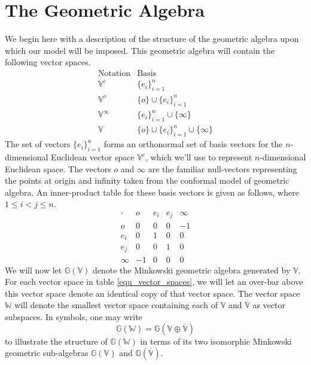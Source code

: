 \documentclass{birkjour}
\theoremstyle{definition}
\theoremstyle{remark}
\numberwithin{equation}{section}
\newcommand{\G}{\mathbb{G}}
\newcommand{\V}{\mathbb{V}}
\newcommand{\Vb}{\mathbb{\overline{V}}}
\newcommand{\W}{\mathbb{W}}
\newcommand{\nvao}{o}
\newcommand{\nvai}{\infty}
\begin{document}
\section{The Geometric Algebra}

We begin here with a description of the structure of the geometric algebra upon
which our model will be imposed.  This
geometric algebra will contain the following vector spaces.
\begin{equation}\label{equ_vector_spaces}
\begin{array}{ll}
\mbox{Notation} & \mbox{Basis} \\
\hline
\V^e & \{e_i\}_{i=1}^n \\
\V^{\nvao} & \{\nvao\}\cup\{e_i\}_{i=1}^n \\
\V^{\nvai} & \{e_i\}_{i=1}^n\cup\{\nvai\} \\
\V & \{\nvao\}\cup\{e_i\}_{i=1}^n\cup\{\nvai\}
\end{array}
\end{equation}
The set of vectors $\{e_i\}_{i=1}^n$ forms an orthonormal set of basis
vectors for the $n$-dimensional Euclidean vector space $\V^e$, which we'll
use to represent $n$-dimensional Euclidean space.
The vectors $\nvao$ and $\nvai$ are the familiar null-vectors representing the
points at origin and infinity taken from the conformal model of geometric algebra.
An inner-product table for these basis vectors is given as follows, where
$1\leq i<j\leq n$.
\begin{equation}
\begin{array}{c|cccc}
\cdot & \nvao & e_i & e_j & \nvai \\
\hline
\nvao & 0 & 0 & 0 & -1 \\
e_i & 0 & 1 & 0 & 0 \\
e_j & 0 & 0 & 1 & 0 \\
\nvai & -1 & 0 & 0 & 0
\end{array}
\end{equation}
We will now let $\G(\V)$ denote the Minkowski geometric algebra generated by $\V$.
For each vector space in table \eqref{equ_vector_spaces}, we will let an over-bar
above this vector space denote an identical copy of that vector space.  The vector
space $\W$ will denote the smallest vector space containing each of $\V$ and $\Vb$
as vector subspaces.  In symbols, one may write
\begin{equation}
\G(\W) = \G(\V\oplus\Vb)
\end{equation}
to illustrate the structure of $\G(\W)$ in terms of its two isomorphic Minkowski
geometric sub-algebras $\G(\V)$ and $\G(\Vb)$.
\end{document}
